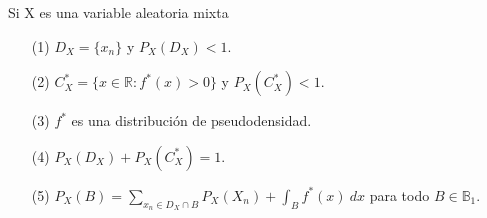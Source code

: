 \begin{obs}
Si X es una variable aleatoria mixta
\begin{enumerate}
    \item[(1)] $D_X = \{x_n\}$ y $P_X(D_X) < 1$.
    \item[(2)] $C_X^* = \{ x \in \mathbb{R} : f^*(x) > 0 \}$ y $P_X(C_X^*) < 1$.
    \item[(3)] $f^*$ es una distribución de pseudodensidad.
    \item[(4)] $P_X(D_X) + P_X(C_X^*) = 1$.
    \item[(5)] $P_X(B) = \sum_{x_n \in D_X \cap B}{P_X(X_n)} + \int_{B}{f^*(x) \ dx}$ para todo $B \in \mathbb{B}_1$.
\end{enumerate}
\end{obs}